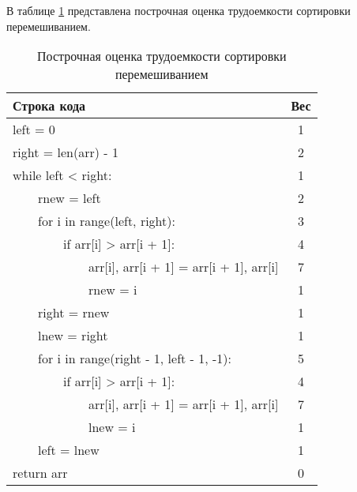     В таблице \ref{tbl:shaker_weight} представлена построчная оценка трудоемкости сортировки перемешиванием.
    \begin{table}[h]
    \begin{center}
        \begin{threeparttable}
        \captionsetup{}
        \caption{\label{tbl:shaker_weight}Построчная оценка трудоемкости сортировки перемешиванием}
        \begin{tabular}{|l|c|}
            \hline
            Строка кода & Вес \\
            \hline
            left = 0 & 1 \\ 
            \hline
            right = len(arr) - 1 & 2 \\ 
            \hline
            while left < right: & 1 \\ 
            \hline
            ~~~~rnew = left & 2 \\ 
            \hline
            ~~~~for i in range(left, right): & 3 \\ 
            \hline
            ~~~~~~~~if arr[i] > arr[i + 1]: & 4 \\ 
            \hline
            ~~~~~~~~~~~~arr[i], arr[i + 1] = arr[i + 1], arr[i] & 7 \\ 
            \hline
            ~~~~~~~~~~~~rnew = i & 1 \\ 
            \hline
            ~~~~right = rnew & 1 \\ 
            \hline
            ~~~~lnew = right & 1 \\ 
            \hline
            ~~~~for i in range(right - 1, left - 1, -1): & 5 \\ 
            \hline
            ~~~~~~~~if arr[i] > arr[i + 1]: & 4 \\ 
            \hline
            ~~~~~~~~~~~~arr[i], arr[i + 1] = arr[i + 1], arr[i] & 7 \\ 
            \hline
            ~~~~~~~~~~~~lnew = i & 1 \\ 
            \hline
            ~~~~left = lnew & 1 \\ 
            \hline
            return arr & 0 \\ 
            \hline
		\end{tabular}
        \end{threeparttable}
    \end{center}
    \end{table}

    \FloatBarrier
    
